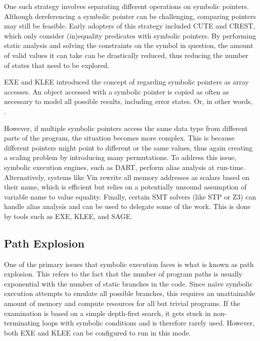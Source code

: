 \documentclass{article}
\begin{document}
\begin{multicols}{2}
    One such strategy involves separating different operations on symbolic pointers. Although dereferencing a symbolic pointer can be challenging, comparing pointers may still be feasible. Early adopters of this strategy included CUTE\cite{CUTE} and CREST\cite{CREST}, which only consider (in)equality predicates with symbolic pointers. By performing static analysis and solving the constraints on the symbol in question, the amount of valid values it can take can be drastically reduced, thus reducing the number of states that need to be explored.

    EXE\cite{EXE} and KLEE\cite{KLEE} introduced the concept of regarding symbolic pointers as array accesses. An object accessed with a symbolic pointer is copied as often as necessary to model all possible results, including error states. Or, in other words, \cite{AllYouEverWanted}.

    However, if multiple symbolic pointers access the same data type from different parts of the program, the situation becomes more complex. This is because different pointers might point to different or the same values, thus again creating a scaling problem by introducing many permutations. To address this issue, symbolic execution engines, such as DART\cite{DART}, perform alias analysis at run-time. Alternatively, systems like Vin\cite{BitBlaze} rewrite all memory addresses as scalars based on their name, which is efficient but relies on a potentially unsound assumption of variable name to value equality. Finally, certain SMT solvers (like STP\cite{STP} or Z3\cite{Z3}) can handle alias analysis and can be used to delegate some of the work. This is done by tools such as EXE\cite{EXE}, KLEE\cite{KLEE}, and SAGE\cite{SAGE}.

    \subsection{Path Explosion}
    One of the primary issues that symbolic execution faces is what is known as path explosion. This refers to the fact that the number of program paths is usually exponential with the number of static branches in the code. Since naïve symbolic execution attempts to emulate all possible branches, this requires an unattainable amount of memory and compute resources for all but trivial programs. If the examination is based on a simple depth-first search, it gets stuck in non-terminating loops with symbolic conditions and is therefore rarely used. However, both EXE\cite{EXE} and KLEE\cite{KLEE} can be configured to run in this mode.


\end{multicols}
\end{document}
